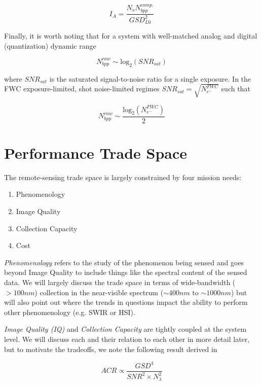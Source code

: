 \documentclass[10pt,journal]{IEEEtran}  %
\begin{document}
\begin{equation}
    I_A = \frac{N_s N_{bpp}^{comp.}}{GSD_{L0}^2}
\end{equation}

Finally, it is worth noting that for a system with well-matched analog and digital (quantization) dynamic range

\begin{equation}
    N_{bpp}^{raw} \sim \textrm{log}_2(SNR_{sat})
\end{equation}

where $SNR_{sat}$ is the saturated signal-to-noise ratio for a single exposure.  In the FWC exposure-limited, shot noise-limited regimes $SNR_{sat} = \sqrt{N_{e^-}^{FWC}}$ such that

\begin{equation}
    \label{eq:n_bpp_Ne}
    N_{bpp}^{raw} \sim \frac{\textrm{log}_2(N_{e^-}^{FWC})}{2}
\end{equation}

\section{Performance Trade Space}
\label{sec:trade_space}

The remote-sensing trade space is largely constrained by four mission needs:

\begin{enumerate}
\item Phenomenology
\item Image Quality
\item Collection Capacity
\item Cost
\end{enumerate}

\emph{Phenomenology} refers to the study of the phenomenon being sensed and goes beyond Image Quality to include things like the spectral content of the sensed data.  We will largely discuss the trade space in terms of wide-bandwidth ($>100nm$) collection in the near-visible spectrum ($\sim 400nm$ to $\sim 1000nm$) but will also point out where the trends in questions impact the ability to perform other phenomenology (e.g. SWIR or HSI).

\emph{Image Quality (IQ)} and \emph{Collection Capacity} are tightly coupled at the system level.  We will discuss each and their relation to each other in more detail later, but to motivate the tradeoffs, we note the following result derived in \cite{shaw}

\begin{equation}
    \label{eq:acr_scaling}
    ACR \propto \frac{GSD^4}{SNR^2 \times N_{\lambda}^2}
\end{equation}
\end{document}
